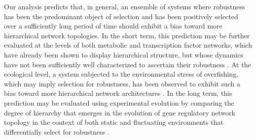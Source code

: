 Our analysis predicts that, in general, an ensemble of systems where robustness has been the predominant object of selection and has been positively selected over a sufficiently long period of time should exhibit a bias toward more hierarchical network topologies. In the short term, this prediction may be further evaluated at the levels of both metabolic and transcription factor networks, which have already been shown to display hierarchical structure, but whose dynamics have not been sufficiently well characterized to ascertain their robustness \cite{Zhao2006,Bhardwaj2010,Colm}. At the ecological level, a system subjected to the environmental stress of overfishing, which may imply selection for robustness, has been observed to exhibit such a bias toward more hierarchical network architectures \cite{Bascompte2005}.
In the long term, this prediction may be evaluated using experimental evolution by comparing the degree of hierarchy that emerges in the evolution of gene regulatory network topology in the context of both static and fluctuating environments that differentially select for robustness \cite{Leroi1994}.

